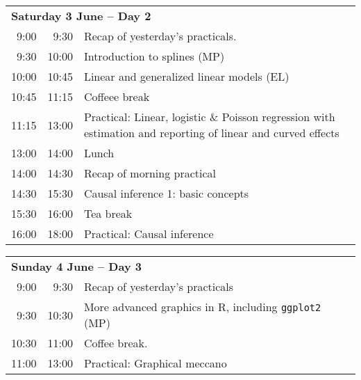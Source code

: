 \noindent
\begin{tabular}{r@{ -- }rp{13cm}}
\multicolumn{3}{l}{\bf Saturday 3 June -- Day 2} \\
 9:00 &  9:30 & Recap of yesterday's practicals. \\
 9:30 & 10:00 & Introduction to splines (MP)\\ %
10:00 & 10:45 & Linear and generalized linear models (EL)\\ %
10:45 & 11:15 & Coffeee break \\
11:15 & 13:00 & Practical: Linear, logistic \& Poisson regression  
                with estimation and reporting of linear and curved
                effects\\ %
13:00 & 14:00 & Lunch \\
14:00 & 14:30 & Recap of morning practical \\
14:30 & 15:30 & Causal inference 1: basic concepts\\ %
15:30 & 16:00 & Tea break\\
16:00 & 18:00 & Practical: Causal inference\\[1em] %
\end{tabular}

\noindent
\begin{tabular}{r@{ -- }rp{13cm}}
 \multicolumn{3}{l}{\bf Sunday 4 June -- Day 3} \\
 9:00 &  9:30 & Recap of yesterday's practicals \\
 9:30 & 10:30 & More advanced graphics in R, including
                \texttt{ggplot2} (MP)\\ %
10:30 & 11:00 & Coffee break. \\
11:00 & 13:00 & Practical: Graphical meccano \\[1em] %
\end{tabular}

